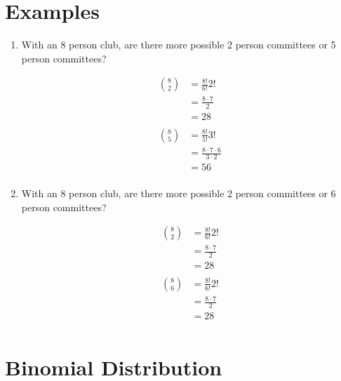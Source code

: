 \documentclass[landscape]{exam}
\begin{document}
  \section{Examples}
  \begin{enumerate}
    \item With an 8 person club, are there more possible 2 person committees or
      5 person committees?

      \begin{solution}
        \begin{align*}
          \binom{8}{2} & = \frac{8!}{6!}{2!} \\
                      & = \frac{8 \cdot 7}{2} \\
                      & = 28 \\
                      \\
          \binom{8}{5} & = \frac{8!}{5!}{3!} \\
                      & = \frac{8 \cdot 7 \cdot 6}{3 \cdot 2} \\
                      & = 56 \\
        \end{align*}
      \end{solution}

    \item With an 8 person club, are there more possible 2 person committees or
      6 person committees?

      \begin{solution}
        \begin{align*}
          \binom{8}{2} & = \frac{8!}{6!}{2!} \\
                      & = \frac{8 \cdot 7}{2} \\
                      & = 28 \\
                      \\
          \binom{8}{6} & = \frac{8!}{6!}{2!} \\
                      & = \frac{8 \cdot 7}{2} \\
                      & = 28 \\
        \end{align*}
      \end{solution}

  \end{enumerate}

  \section{Binomial Distribution}
\end{document}
